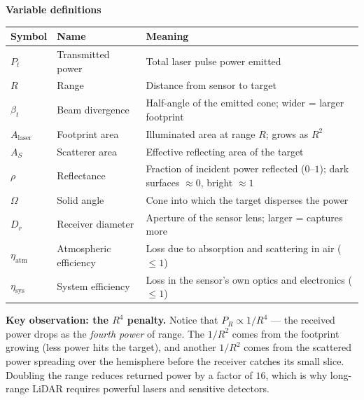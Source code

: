 \documentclass[12pt, a4paper]{article}
\begin{document}
\begin{notebox}
  \textbf{Variable definitions}

  \vspace{4pt}
  \begin{tabular}{@{}l p{3.8cm} p{7.2cm}@{}}
    \toprule
    \textbf{Symbol} & \textbf{Name} & \textbf{Meaning} \\
    \midrule
    $P_t$           & Transmitted power
      & Total laser pulse power emitted \\[2pt]
    $R$             & Range
      & Distance from sensor to target \\[2pt]
    $\beta_t$       & Beam divergence
      & Half-angle of the emitted cone; wider = larger footprint \\[2pt]
    $A_\text{laser}$& Footprint area
      & Illuminated area at range $R$; grows as $R^2$ \\[2pt]
    $A_S$           & Scatterer area
      & Effective reflecting area of the target \\[2pt]
    $\rho$          & Reflectance
      & Fraction of incident power reflected ($0$--$1$); dark surfaces $\approx 0$, bright $\approx 1$ \\[2pt]
    $\Omega$        & Solid angle
      & Cone into which the target disperses the power \\[2pt]
    $D_r$           & Receiver diameter
      & Aperture of the sensor lens; larger = captures more \\[2pt]
    $\eta_\text{atm}$ & Atmospheric efficiency
      & Loss due to absorption and scattering in air ($\leq 1$) \\[2pt]
    $\eta_\text{sys}$ & System efficiency
      & Loss in the sensor's own optics and electronics ($\leq 1$) \\
    \bottomrule
  \end{tabular}

  \vspace{6pt}
  \textbf{Key observation: the $R^4$ penalty.}
  Notice that $P_R \propto 1/R^4$ --- the received power drops as the
  \emph{fourth power} of range.  The $1/R^2$ comes from the footprint
  growing (less power hits the target), and another $1/R^2$ comes from
  the scattered power spreading over the hemisphere before the receiver
  catches its small slice.  Doubling the range reduces returned power by
  a factor of $16$, which is why long-range LiDAR requires powerful lasers
  and sensitive detectors.
\end{notebox}
\end{document}
